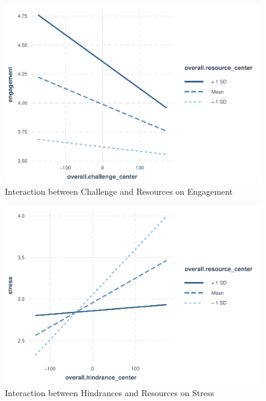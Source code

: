 \documentclass[
  man,mask]{apa7}
\begin{document}
\begin{figure}
\centering
\includegraphics{Submission_files/figure-latex/chal-resource-int-1.pdf}
\caption{\label{fig:chal-resource-int}Interaction between Challenge and Resources on Engagement}
\end{figure}

\begin{figure}
\centering
\includegraphics{Submission_files/figure-latex/hind-resource-stress-int-1.pdf}
\caption{\label{fig:hind-resource-stress-int}Interaction between Hindrances and Resources on Stress}
\end{figure}
\end{document}
